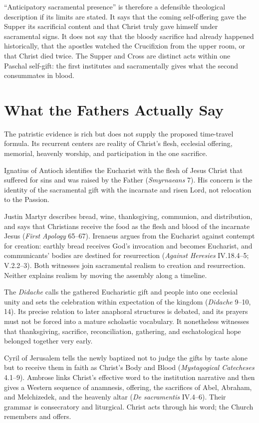 \begin{deepstudy}
``Anticipatory sacramental presence'' is therefore a defensible theological
description if its limits are stated. It says that the coming self-offering
gave the Supper its sacrificial content and that Christ truly gave himself
under sacramental signs. It does not say that the bloody sacrifice had already
happened historically, that the apostles watched the Crucifixion from the
upper room, or that Christ died twice. The Supper and Cross are distinct acts
within one Paschal self-gift: the first institutes and sacramentally gives what
the second consummates in blood.

\section{What the Fathers Actually Say}

The patristic evidence is rich but does not supply the proposed time-travel
formula. Its recurrent centers are reality of Christ's flesh, ecclesial
offering, memorial, heavenly worship, and participation in the one sacrifice.

Ignatius of Antioch identifies the Eucharist with the flesh of Jesus Christ
that suffered for sins and was raised by the Father
(\emph{Smyrnaeans} 7). His concern is the identity of the sacramental gift
with the incarnate and risen Lord, not relocation to the Passion.

Justin Martyr describes bread, wine, thanksgiving, communion, and distribution,
and says that Christians receive the food as the flesh and blood of the
incarnate Jesus (\emph{First Apology} 65--67). Irenaeus argues from the
Eucharist against contempt for creation: earthly bread receives God's
invocation and becomes Eucharist, and communicants' bodies are destined for
resurrection (\emph{Against Heresies} IV.18.4--5; V.2.2--3). Both witnesses
join sacramental realism to creation and resurrection. Neither explains
realism by moving the assembly along a timeline.

The \emph{Didache} calls the gathered Eucharistic gift and people into one
ecclesial unity and sets the celebration within expectation of the kingdom
(\emph{Didache} 9--10, 14). Its precise relation to later anaphoral structures
is debated, and its prayers must not be forced into a mature scholastic
vocabulary. It nonetheless witnesses that thanksgiving, sacrifice,
reconciliation, gathering, and eschatological hope belonged together very
early.

Cyril of Jerusalem tells the newly baptized not to judge the gifts by taste
alone but to receive them in faith as Christ's Body and Blood
(\emph{Mystagogical Catecheses} 4.1--9). Ambrose links Christ's effective word
to the institution narrative and then gives a Western sequence of anamnesis,
offering, the sacrifices of Abel, Abraham, and Melchizedek, and the heavenly
altar (\emph{De sacramentis} IV.4--6). Their grammar is consecratory and
liturgical. Christ acts through his word; the Church remembers and offers.


\end{deepstudy}
